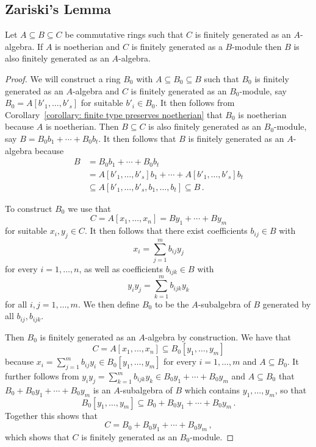 \subsection{Zariski’s Lemma}
\label{subsection: Zariskis lemma}


\begin{lemma}
  \label{lemma: technical ring lemma}
  Let $A \subseteq B \subseteq C$ be commutative rings such that $C$ is finitely generated as an $A$-algebra.
  If  $A$ is noetherian and $C$ is finitely generated as a $B$-module then $B$ is also finitely generated as an $A$-algebra.
\end{lemma}


\begin{proof}
  We will construct a ring $B_0$ with $A \subseteq B_0 \subseteq B$ such that $B_0$ is finitely generated as an $A$-algebra and $C$ is finitely generated as an $B_0$-module, say $B_0 = A[b'_1, \dotsc, b'_s]$ for suitable $b'_i \in B_0$.
  It then follows from Corollary~\ref{corollary: finite type preserves noetherian} that $B_0$ is noetherian because $A$ is noetherian.
  Then $B \subseteq C$ is also finitely generated as an $B_0$-module, say $B = B_0 b_1 + \dotsb + B_0 b_t$.
  It then follows that $B$ is finitely generated as an $A$-algebra because
  \begin{align*}
                B
    &=          B_0 b_1 + \dotsb + B_0 b_t  \\
    &=          A[b'_1, \dotsc, b'_s] b_1 + \dotsb + A[b'_1, \dotsc, b'_s] b_t  \\
    &\subseteq  A[b'_1, \dotsc, b'_s, b_1, \dotsc, b_t]
     \subseteq  B \,.
  \end{align*}
  
  To construct $B_0$ we use that
  \[
      C
    = A[x_1, \dotsc, x_n]
    = B y_1 + \dotsb + B y_m
  \]
  for suitable $x_i, y_j \in C$.
  It then follows that there exist coefficients $b_{ij} \in B$ with
  \[
      x_i
    = \sum_{j=1}^m b_{ij} y_j
  \]
  for every $i = 1, \dotsc, n$, as well as coefficients $b_{ijk} \in B$ with
  \[
      y_i y_j
    = \sum_{k=1}^m b_{ijk} y_k
  \]
  for all $i,j = 1, \dotsc, m$.
  We then define $B_0$ to be the $A$-subalgebra of $B$ generated by all $b_{ij}, b_{ijk}$.
  
  Then $B_0$ is finitely generated as an $A$-algebra by construction.
  We have that
  \[
              C
    =         A[x_1, \dotsc, x_n]
    \subseteq B_0[y_1, \dotsc, y_m]
  \]
  because $x_i = \sum_{j=1}^m b_{ij} y_i \in B_0[y_1, \dotsc, y_m]$ for every $i = 1, \dotsc, m$ and $A \subseteq B_0$.
  It further follows from $y_i y_j = \sum_{k=1}^m b_{ijk} y_k \in B_0 y_1 + \dotsb + B_0 y_m$ and $A \subseteq B_0$ that $B_0 + B_0 y_1 + \dotsb + B_0 y_m$ is an $A$-subalgebra of $B$ which contains $y_1, \dotsc, y_m$, so that
  \[
              B_0[y_1, \dotsc, y_m]
    \subseteq B_0 + B_0 y_1 + \dotsb + B_0 y_m \,.
  \]
  Together this shows that
  \[
      C
    = B_0 + B_0 y_1 + \dotsb + B_0 y_m \,,
  \]
  which shows that $C$ is finitely generated as an $B_0$-module.
\end{proof}


